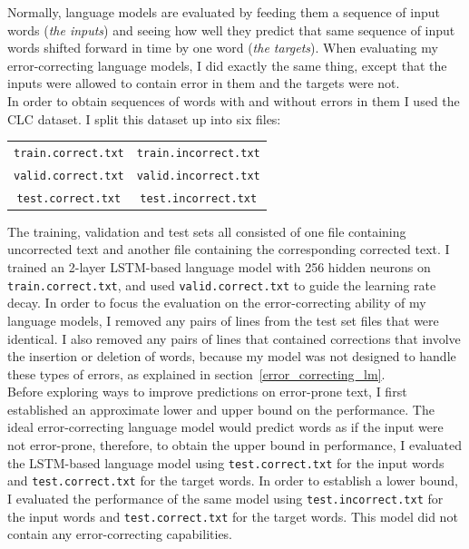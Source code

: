 \documentclass[a4paper, 12pt]{report}
\newcommand{\ttt}[1]{\texttt{#1}}
\newcommand{\tit}[1]{\textit{#1}}
\begin{document}
Normally, language models are evaluated by feeding them a sequence of input words (\tit{the inputs}) and seeing how well they predict that same sequence of input words shifted forward in time by one word (\tit{the targets}). When evaluating my error-correcting language models, I did exactly the same thing, except that the inputs were allowed to contain error in them and the targets were not. \\

In order to obtain sequences of words with and without errors in them I used the CLC dataset. I split this dataset up into six files:
\begin{center}
\begin{tabular}{c c}
	\ttt{train.correct.txt} & \ttt{train.incorrect.txt} \\
	\ttt{valid.correct.txt} & \ttt{valid.incorrect.txt} \\
	\ttt{test.correct.txt} & \ttt{test.incorrect.txt}
\end{tabular}
\end{center}
The training, validation and test sets all consisted of one file containing uncorrected text and another file containing the corresponding corrected text. I trained an 2-layer LSTM-based language model with 256 hidden neurons on \ttt{train.correct.txt}, and used \ttt{valid.correct.txt} to guide the learning rate decay. In order to focus the evaluation on the error-correcting ability of my language models, I removed any pairs of lines from the test set files that were identical. I also removed any pairs of lines that contained corrections that involve the insertion or deletion of words, because my model was not designed to handle these types of errors, as explained in section~\ref{error_correcting_lm}. \\

Before exploring ways to improve predictions on error-prone text, I first established an approximate lower and upper bound on the performance. The ideal error-correcting language model would predict words as if the input were not error-prone, therefore, to obtain the upper bound in performance, I evaluated the LSTM-based language model using \ttt{test.correct.txt} for the input words and \ttt{test.correct.txt} for the target words. In order to establish a lower bound, I evaluated the performance of the same model using \ttt{test.incorrect.txt} for the input words and \ttt{test.correct.txt} for the target words. This model did not contain any error-correcting capabilities. \\
\end{document}
